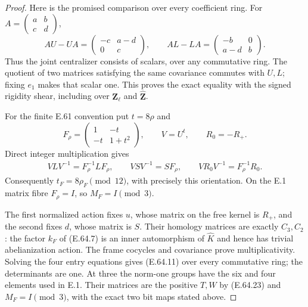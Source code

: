 \begin{proof}
Here is the promised comparison over every coefficient ring.
For $A=\left(\begin{smallmatrix}a&b\\c&d\end{smallmatrix}\right)$,
\[
 AU-UA=\begin{pmatrix}-c&a-d\\0&c\end{pmatrix},\qquad
 AL-LA=\begin{pmatrix}-b&0\\a-d&b\end{pmatrix}.
 \tag{E.64.25}
\]
Thus the joint centralizer consists of scalars, over any
commutative ring.  The quotient of two matrices satisfying
the same covariance commutes with $U,L$; fixing $e_1$ makes
that scalar one.  This proves the exact equality with the
signed rigidity shear, including over $\mathbf Z_\ell$ and
$\widehat{\mathbf Z}$.

For the finite E.61 convention put $t=8\rho$ and
\[
 F_\rho=\begin{pmatrix}1&-t\\-t&1+t^2\end{pmatrix},\qquad
 V=U^t,\qquad R_0=-R_+.
 \tag{E.64.26}
\]
Direct integer multiplication gives
\[
 \begin{gathered}
 VLV^{-1}=F_\rho^{-1}LF_\rho,\qquad
 VSV^{-1}=SF_\rho,\qquad
 VR_0V^{-1}=F_\rho^{-1}R_0.
 \end{gathered}
 \tag{E.64.27}
\]
Consequently $t_F=8\rho_F\pmod {12}$, with precisely this
orientation.  On the E.1 matrix fibre $F_\rho=I$, so
$M_F=I\pmod3$.

The first normalized action fixes $u$, whose matrix on the
free kernel is $R_+$, and the second fixes $d$, whose matrix
is $S$.  Their homology matrices are exactly $C_3,C_2$:
the factor $k_F$ of (E.64.7) is an inner automorphism of
$\widehat K$ and hence has trivial abelianization action.
The frame cocycles and covariance prove multiplicativity.
Solving the four entry equations gives (E.64.11) over every
commutative ring; the determinants are one.  At three the
norm-one groups have the six and four elements used in E.1.
Their matrices are the positive $T,W$ by (E.64.23) and
$M_F=I\pmod3$, with the exact two bit maps stated above.


\end{proof}

